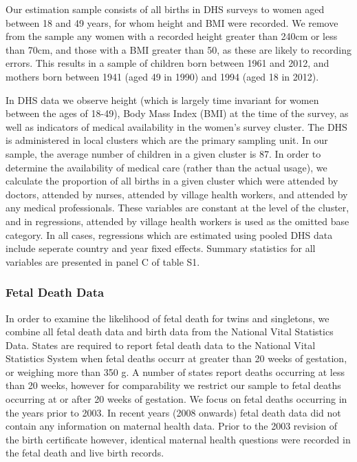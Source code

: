 \documentclass{nature}
\begin{document}
\begin{linenumbers}
Our estimation sample consists of all births in DHS surveys to women aged between 18 and 49 years, for whom height and BMI were recorded.  We remove from the sample any women with a recorded height greater than 240cm or less than 70cm, and those with a BMI greater than 50, as these are likely to recording errors.  This results in a sample of children born between 1961 and 2012, and mothers born between 1941 (aged 49 in 1990) and 1994 (aged 18 in 2012).  

In DHS data we observe height (which is largely time invariant for women between the ages of 18-49), Body Mass Index (BMI) at the time of the survey, as well as indicators of medical availability in the women's survey cluster.  The DHS is administered in local clusters which are the primary sampling unit.  In our sample, the average number of children in a given cluster is 87.  In order to determine the availability of medical care (rather than the actual usage), we calculate the proportion of all births in a given cluster which were attended by doctors, attended by nurses, attended by village health workers, and attended by any medical professionals.  These variables are constant at the level of the cluster, and in regressions, attended by village health workers is used as the omitted base category.  In all cases, regressions which are estimated using pooled DHS data include seperate country and year fixed effects.  Summary statistics for all variables are presented in panel C of table S1.

\subsubsection{Fetal Death Data}
In order to examine the likelihood of fetal death for twins and singletons, we combine all fetal death data and birth data from the National Vital Statistics Data.   States are required to report fetal death data to the National Vital Statistics System when fetal deaths occurr at greater than 20 weeks of gestation, or weighing more than 350 g. A number of states report deaths occurring at less than 20 weeks, however for comparability we restrict our sample to fetal deaths occurring at or after 20 weeks of gestation.  We focus on fetal deaths occurring in the years prior to 2003.  In recent years (2008 onwards) fetal death data did not contain any information on maternal health data.  Prior to the 2003 revision of the birth certificate however, identical maternal health questions were recorded in the fetal death and live birth records.


\end{linenumbers}
\end{document}
